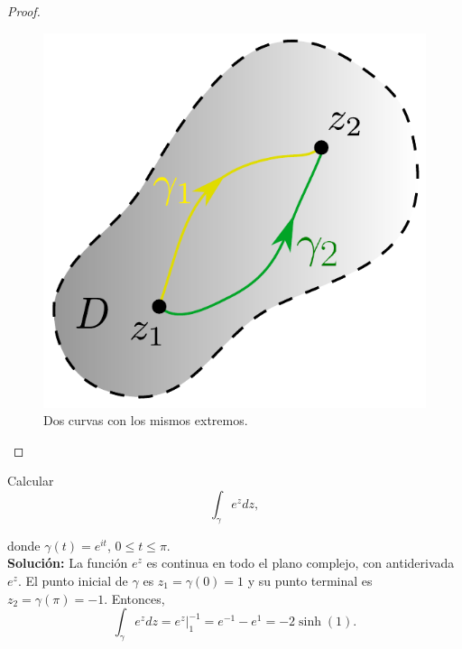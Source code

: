 \begin{proof}
\begin{itemize}
 \begin{figure}[H]
        \centering
        \includegraphics[scale = 0.45]{Figuras/TFCIntegralLinea2.pdf}
        \caption{Dos curvas con los mismos extremos.}
        \label{fig:TFC2}
    \end{figure}
\end{itemize}
\end{proof}

\begin{ejemplo}
Calcular
$$\int_{\gamma} e^z dz,$$

donde $\gamma(t) = e^{it}$, $0 \leq t \leq \pi.$
\\

\textbf{Solución:} La función $e^z$ es continua en todo el plano complejo, con antiderivada $e^z$. El punto inicial de $\gamma$ es $z_1 = \gamma(0) = 1$ y su punto terminal es $z_2 = \gamma(\pi) = -1$. Entonces,
$$\int_{\gamma} e^z dz = \left. e^z \right|_{1}^{-1} = e^{-1}-e^1 = - 2 \sinh(1).$$
\end{ejemplo}


